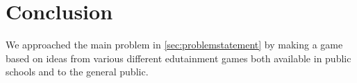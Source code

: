 \section{Conclusion}
\label{sec:report_conclusion}



We approached the main problem in \autoref{sec:problemstatement} by making a game based on ideas from various different edutainment games both available in public schools and to the general public.\\





